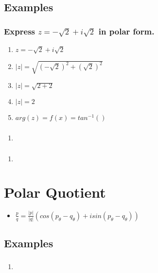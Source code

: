\documentclass{report}
\newcommand{\abs}[1]{\mathopen|#1\mathclose|}
\renewcommand{\arg}[1]{arg(#1)}
\renewcommand{\sin}[1]{sin(#1)}
\renewcommand{\cos}[1]{cos(#1)}
\renewcommand{\arctan}[1]{f(x)=tan^{-1}(#1)}
\begin{document}
            \subsection{Examples}
                \subsubsection{Express $z=-\sqrt{2}+i\sqrt{2}$ in polar form.}
                    \begin{enumerate}
                        \item $z=-\sqrt{2}+i\sqrt{2}$
                        \item $\abs{z}=\sqrt{(-\sqrt{2})^2+(\sqrt{2})^2}$
                        \item $\abs{z}=\sqrt{2+2}$
                        \item $\abs{z}=2$
                        \item $\arg{z}=\arctan{}$
                    \end{enumerate}
                \subsubsection{}
                    \begin{enumerate}
                        \item 
                    \end{enumerate}
                \subsubsection{}
                    \begin{enumerate}
                        \item 
                    \end{enumerate}
        \section{Polar Quotient}
            \begin{itemize}
                \item $\frac{p}{q}=\frac{|p|}{|q|}(\cos{p_\theta-q_\theta}+i\sin{p_\theta-q_\theta})$
            \end{itemize}
            \subsection{Examples}
                \subsubsection{}
                    \begin{enumerate}
                        \item 
                    \end{enumerate}
\end{document}

